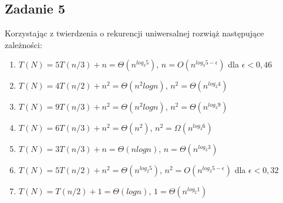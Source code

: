 \documentclass{article}
\begin{document}
\subsection*{Zadanie 5}
Korzystając z twierdzenia o rekurencji uniwersalnej rozwiąż następujące zależności:
\begin{enumerate}[label=(\alph*)]
    \item $T(N) = 5T(n/3) + n = \Theta(n^{log_3 5})$, $n = O(n^{log_3 5-\epsilon})$ dla $\epsilon < 0,46 $
    \item $T(N) = 4T(n/2) + n^2 = \Theta(n^2logn)$, $n^2 = \Theta(n^{log_2 4})$
    \item $T(N) = 9T(n/3) + n^2 = \Theta(n^2logn)$, $n^2 = \Theta(n^{log_3 9})$
    \item $T(N) = 6T(n/3) + n^2 = \Theta(n^2)$, $n^2 = \Omega(n^{log_3 6})$
    \item $T(N) = 3T(n/3) + n = \Theta(nlogn)$, $n = \Theta(n^{log_3 3})$
    \item $T(N) = 5T(n/2) + n^2 = \Theta(n^{log_2 5})$, $n^2 = O(n^{log_2 5-\epsilon})$ dla $\epsilon < 0,32$
    \item $T(N) = T(n/2) + 1 = \Theta(logn)$, $1 = \Theta(n^{log_2 1})$
\end{enumerate}
\end{document}
